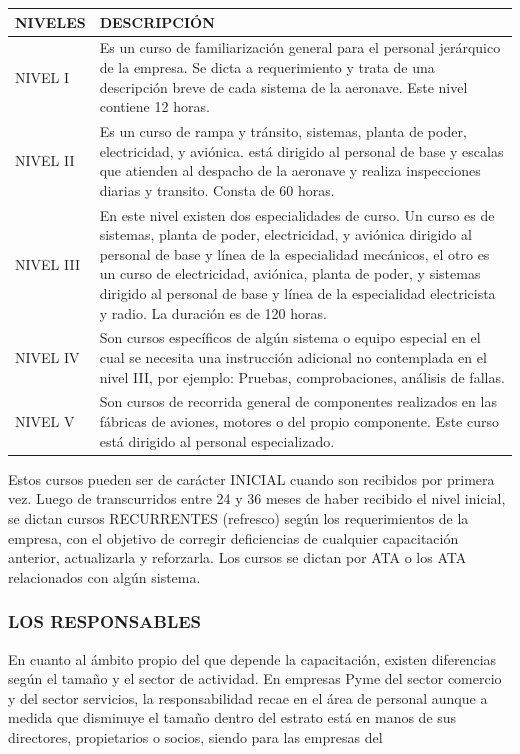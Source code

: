 \begin{center}
\small
\begin{tabular}{|p{}|p{}|}
\hline
NIVELES & DESCRIPCIÓN \\ \hline
NIVEL I & Es un curso de familiarización general para el personal jerárquico de la empresa. Se dicta a requerimiento y trata de una descripción breve de cada sistema de la aeronave. Este nivel contiene 12 horas. \\ \hline
NIVEL II & Es un curso de rampa y tránsito, sistemas, planta de poder, electricidad, y aviónica. está dirigido al personal de base y escalas que atienden al despacho de la aeronave y realiza inspecciones diarias y transito. Consta de 60 horas. \\ \hline
NIVEL III & En este nivel existen dos especialidades de curso. Un curso es de sistemas, planta de poder, electricidad, y aviónica dirigido al personal de base y línea de la especialidad mecánicos, el otro es un curso de electricidad, aviónica, planta de poder, y sistemas dirigido al personal de base y línea de la especialidad electricista y radio. La duración es de 120 horas. \\ \hline
NIVEL IV & Son cursos específicos de algún sistema o equipo especial en el cual se necesita una instrucción adicional no contemplada en el nivel III, por ejemplo: Pruebas, comprobaciones, análisis de fallas. \\ \hline
NIVEL V & Son cursos de recorrida general de componentes realizados en las fábricas de aviones, motores o del propio componente. Este curso está dirigido al personal especializado. \\ \hline
\end{tabular}
\end{center}

Estos cursos pueden ser de carácter INICIAL cuando son recibidos por primera vez. Luego de transcurridos entre 24 y 36 meses de haber recibido el nivel inicial, se dictan cursos RECURRENTES (refresco) según los requerimientos de la empresa, con el objetivo de corregir deficiencias de cualquier capacitación anterior, actualizarla y reforzarla. Los cursos se dictan por ATA o los ATA relacionados con algún sistema.

\subsubsection*{LOS RESPONSABLES}
En cuanto al ámbito propio del que depende la capacitación, existen diferencias según el tamaño y el sector de actividad. En empresas Pyme del sector comercio y del sector servicios, la responsabilidad recae en el área de personal aunque a medida que disminuye el tamaño dentro del estrato está en manos de sus directores, propietarios o socios, siendo para las empresas del


